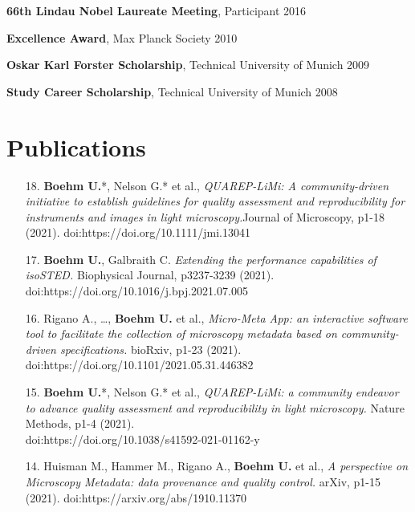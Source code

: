 \documentclass[margin,line]{res}
\begin{document}
\begin{resume}
\vspace*{-3mm}
{\bf 66th Lindau Nobel Laureate Meeting}, Participant \hfill {2016}

\vspace*{-3mm}
{\bf Excellence Award}, Max Planck Society \hfill 2010

\vspace*{-3mm}
{\bf Oskar Karl Forster Scholarship}, Technical University of Munich  \hfill 2009

\vspace*{-3mm}
{\bf Study Career Scholarship}, Technical University of Munich  \hfill 2008


\section{\sc Publications}

\begin{enumerate}[leftmargin=*]

\item[18.] {\bf Boehm U.}*, Nelson G.* et al., {\it QUAREP-LiMi: A community-driven initiative to establish guidelines for quality assessment and reproducibility for instruments and images in light microscopy.}Journal of Microscopy, p1-18 (2021). doi:https://doi.org/10.1111/jmi.13041

\item[17.] {\bf Boehm U.}, Galbraith C. {\it Extending the performance capabilities of isoSTED.} Biophysical Journal, p3237-3239 (2021). doi:https://doi.org/10.1016/j.bpj.2021.07.005

\item[16.] Rigano A., \dots, {\bf Boehm U.} et al., {\it Micro-Meta App: an interactive software tool to facilitate the collection of microscopy metadata based on community-driven specifications.} bioRxiv, p1-23 (2021). doi:https://doi.org/10.1101/2021.05.31.446382

\item[15.] {\bf Boehm U.}*, Nelson G.* et al., {\it QUAREP-LiMi: a community endeavor to advance quality assessment and reproducibility in light microscopy.} Nature Methods, p1-4 (2021). \\doi:https://doi.org/10.1038/s41592-021-01162-y

\item[14.] Huisman M., Hammer M., Rigano A., {\bf Boehm U.} et al., {\it A perspective on Microscopy Metadata: data provenance and quality control.} arXiv, p1-15 (2021). doi:https://arxiv.org/abs/1910.11370


\end{enumerate}
\end{resume}
\end{document}

